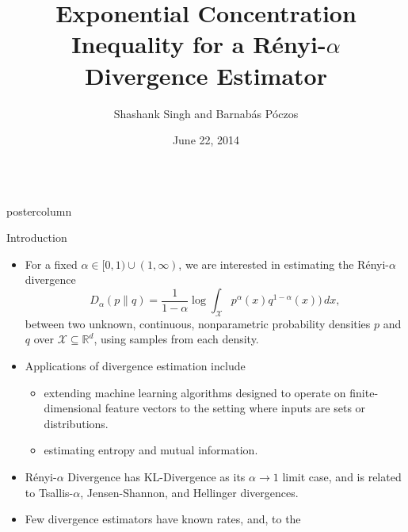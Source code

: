 \documentclass[final,hyperref={pdfpagelabels=false}]{beamer}
\title{\Large Exponential Concentration Inequality for a R\'enyi-$\alpha$
                                                        Divergence Estimator}
\author{Shashank Singh and Barnab\'as P\'oczos}
\institute[Carnegie-Mellon University]{Machine Learning Department,
                            Carnegie-Mellon University, Pittsburgh, PA, USA}
\date[June 22, 2014]{June 22, 2014}
\newcommand{\R}{\mathbb{R}}
\newcommand{\X}{\mathcal{X}}
\newlength{\columnheight}
\begin{document}
\begin{frame}
  \begin{columns}
    \begin{column}{.32\textwidth}
      \begin{beamercolorbox}[center,wd=\textwidth]{postercolumn}
        \begin{minipage}[T]{.95\textwidth}  %
          \parbox[t][\columnheight]{\textwidth}{ %
            \vfill
            \begin{block}{Introduction}
              \begin{itemize}
              \item For a fixed $\alpha \in [0,1) \cup (1,\infty)$, we are
                    interested in estimating the R\'enyi-$\alpha$ divergence
                    \[D_\alpha(p\|q)
                        = \frac{1}{1 - \alpha} \log \int_\X
                                        p^\alpha(x)q^{1 - \alpha}(x)) \, dx,\]
                    between two unknown, continuous, nonparametric probability
                    densities $p$ and $q$ over $\X \subseteq \R^d$, using
                    samples from each density.
              \item Applications of divergence estimation include
                \begin{itemize}
                \item extending machine learning algorithms designed to operate
                      on finite-dimensional feature vectors to the setting
                      where inputs are sets or distributions.
                \item estimating entropy and mutual information.
                \end{itemize}
              \item R\'enyi-$\alpha$ Divergence has KL-Divergence as its
                    $\alpha \to 1$ limit case, and is related to
                    Tsallis-$\alpha$, Jensen-Shannon, and Hellinger
                    divergences.
              \item Few divergence estimators have known rates, and, to the

\end{itemize}
\end{block}}
\end{minipage}
\end{beamercolorbox}
\end{column}
\end{columns}
\end{frame}
\end{document}
